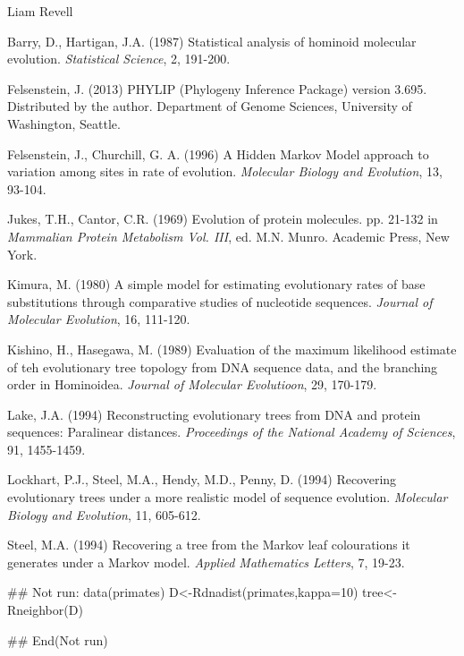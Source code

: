 \documentclass[a4paper]{book}
\begin{document}
%
\begin{Author}\relax
Liam Revell 
\end{Author}
%
\begin{References}\relax

Barry, D., Hartigan, J.A. (1987) Statistical analysis of hominoid molecular evolution. \emph{Statistical Science}, 2, 191-200.

Felsenstein, J. (2013) PHYLIP (Phylogeny Inference Package) version 3.695. Distributed by the author. Department of Genome Sciences, University of Washington, Seattle.

Felsenstein, J., Churchill, G. A. (1996) A Hidden Markov Model approach to variation among sites in rate of evolution. \emph{Molecular Biology and Evolution}, 13, 93-104.

Jukes, T.H., Cantor, C.R. (1969) Evolution of protein molecules. pp. 21-132 in \emph{Mammalian Protein Metabolism Vol. III}, ed. M.N. Munro. Academic Press, New York.

Kimura, M. (1980) A simple model for estimating evolutionary rates of base substitutions through comparative studies of nucleotide sequences. \emph{Journal of Molecular Evolution}, 16, 111-120.

Kishino, H., Hasegawa, M. (1989) Evaluation of the maximum likelihood estimate of teh evolutionary tree topology from DNA sequence data, and the branching order in Hominoidea. \emph{Journal of Molecular Evolutioon}, 29, 170-179.

Lake, J.A. (1994) Reconstructing evolutionary trees from DNA and protein sequences: Paralinear distances. \emph{Proceedings of the National Academy of Sciences}, 91, 1455-1459.

Lockhart, P.J., Steel, M.A., Hendy, M.D., Penny, D. (1994) Recovering evolutionary trees under a more realistic model of sequence evolution. \emph{Molecular Biology and Evolution}, 11, 605-612.

Steel, M.A. (1994) Recovering a tree from the Markov leaf colourations it generates under a Markov model. \emph{Applied Mathematics Letters}, 7, 19-23.
\end{References}
%
\begin{SeeAlso}\relax
{}
\end{SeeAlso}
%
\begin{Examples}
\begin{ExampleCode}
## Not run: 
data(primates)
D<-Rdnadist(primates,kappa=10)
tree<-Rneighbor(D)

## End(Not run)
\end{ExampleCode}
\end{Examples}
\end{document}
